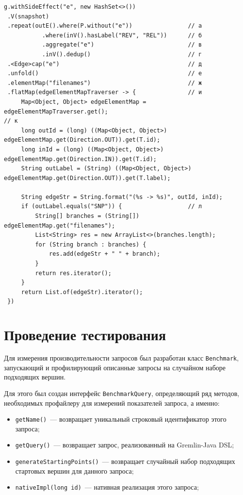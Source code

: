 \documentclass[times,specification,annotation]{itmo-student-thesis}
\begin{document}
\begin{lstlisting}[float=!h,caption={Дерево ревизий снимка на Gremlin},label={lst:snp}]
g.withSideEffect("e", new HashSet<>())
 .V(snapshot)
 .repeat(outE().where(P.without("e"))                // а
           .where(inV().hasLabel("REV", "REL"))      // б
           .aggregate("e")                           // в
           .inV().dedup()                            // г
 .<Edge>cap("e")                                     // д
 .unfold()                                           // е
 .elementMap("filenames")                            // ж
 .flatMap(edgeElementMapTraverser -> {               // и
     Map<Object, Object> edgeElementMap = edgeElementMapTraverser.get();                                       // к
     long outId = (long) ((Map<Object, Object>) edgeElementMap.get(Direction.OUT)).get(T.id);
     long inId = (long) ((Map<Object, Object>) edgeElementMap.get(Direction.IN)).get(T.id);
     String outLabel = (String) ((Map<Object, Object>) edgeElementMap.get(Direction.OUT)).get(T.label);

     String edgeStr = String.format("(%s -> %s)", outId, inId);
     if (outLabel.equals("SNP")) {                   // л
         String[] branches = (String[]) edgeElementMap.get("filenames");
         List<String> res = new ArrayList<>(branches.length);
         for (String branch : branches) {
             res.add(edgeStr + " " + branch);
         }
         return res.iterator();
     }
     return List.of(edgeStr).iterator();
 })
\end{lstlisting}

\section{Проведение тестирования}

Для измерения производительности запросов был разработан класс \texttt{Benchmark}, запускающий и профилирующий описанные запросы на случайном наборе подходящих вершин. 

Для этого был создан интерфейс \texttt{BenchmarkQuery}, определяющий ряд методов, необходимых профайлеру для измерений показателей запроса, а именно:

\begin{itemize}
    \item \texttt{getName()}~--- возвращает уникальный строковый идентификатор этого запроса;
    \item \texttt{getQuery()}~--- возвращает запрос, реализованный на Gremlin-Java DSL;
    \item \texttt{generateStartingPoints()}~--- возвращает случайный набор подходящих стартовых вершин для данного запроса;
    \item \texttt{nativeImpl(long id)}~--- нативная реализация этого запроса;
\end{itemize}
\end{document}
